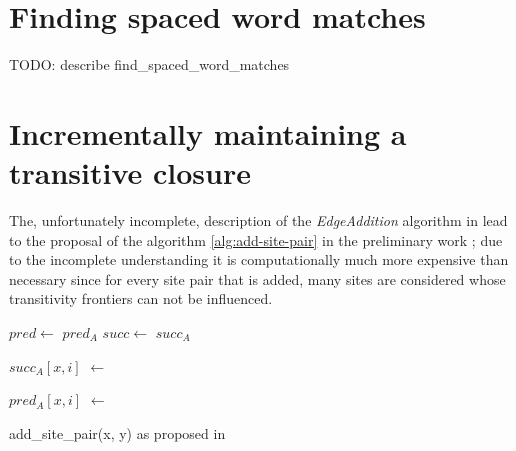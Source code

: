\section{Finding spaced word matches}

TODO: describe find\_spaced\_word\_matches

\section{Incrementally maintaining a transitive closure}

The, unfortunately incomplete, description of the \textit{EdgeAddition} algorithm in \cite{abdeddaim2000speeding} lead to the proposal of the algorithm \ref{alg:add-site-pair} in the preliminary work \cite{hundt2020praktkium}; due to the incomplete understanding it is computationally much more expensive than necessary since for every site pair that is added, many sites are considered whose transitivity frontiers can not be influenced.

\begin{algorithm}[h]
	\DontPrintSemicolon

	
	$pred \leftarrow$ $pred_A$\;
	$succ \leftarrow$ $succ_A$\;
	
	 {
		 {
			 {
				$succ_A[x, i]$ $\leftarrow$ 
			}
		}
	}
	
	 {
		 {
			 {
				$pred_A[x, i]$ $\leftarrow$ 
			}
		}
	}
	\caption{add\_site\_pair(x, y) as proposed in \cite{hundt2020praktkium}}
	\label{alg:add-site-pair}
\end{algorithm}

